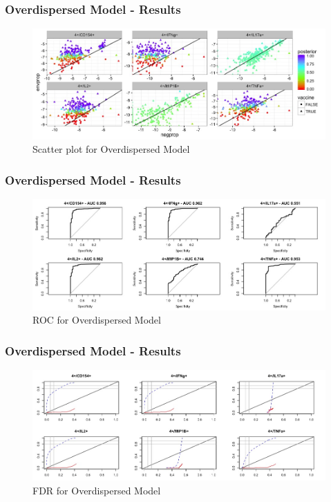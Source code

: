 \documentclass{beamer}
\theoremstyle{definition}
\begin{document}
\begin{frame}
\frametitle{Overdispersed Model - Results}
\begin{figure}[]
\includegraphics[width=12 cm]{figures/marginalBBscatter} \caption{Scatter plot for Overdispersed Model }
\end{figure}
\end{frame}


\begin{frame}
\frametitle{Overdispersed Model - Results}
\begin{figure}[]
\includegraphics[width=12 cm]{figures/marginalBBroc} \caption{ROC for Overdispersed Model}
\end{figure}
\end{frame}


\begin{frame}
\frametitle{Overdispersed Model - Results}
\begin{figure}[]
\includegraphics[width=12 cm]{figures/marginalBBfdr} \caption{FDR for Overdispersed Model}
\end{figure}
\end{frame}
\end{document}
